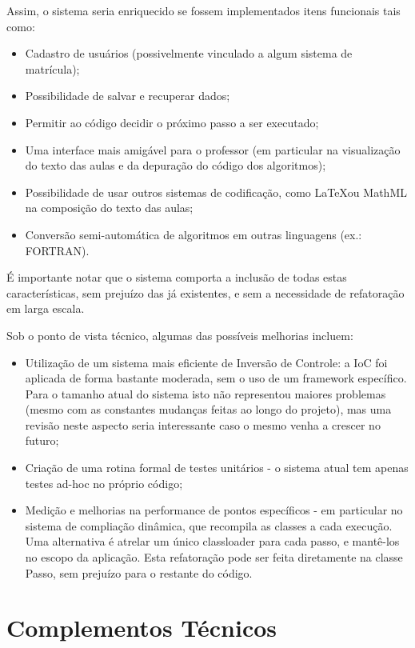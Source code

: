 \documentclass{abnt}
\begin{document}
Assim, o sistema seria enriquecido se fossem implementados itens funcionais tais como:

\begin{itemize}
\item Cadastro de usuários (possivelmente vinculado a algum sistema de matrícula);
\item Possibilidade de salvar e recuperar dados;
\item Permitir ao código decidir o próximo passo a ser executado;
\item Uma interface mais amigável para o professor (em particular na visualização do texto das aulas e da depuração do código dos algoritmos);
\item Possibilidade de usar outros sistemas de codificação, como \LaTeX ou MathML na composição do texto das aulas;
\item Conversão semi-automática de algoritmos em outras linguagens (ex.: FORTRAN).
\end{itemize}

É importante notar que o sistema comporta a inclusão de todas estas características, sem prejuízo das já existentes, e sem a necessidade de refatoração em larga escala.

Sob o ponto de vista técnico, algumas das possíveis melhorias incluem:

\begin{itemize}
\item Utilização de um sistema mais eficiente de Inversão de Controle: a IoC foi aplicada de forma bastante moderada, sem o uso de um framework específico. Para o tamanho atual do sistema isto não representou maiores problemas (mesmo com as constantes mudanças feitas ao longo do projeto), mas uma revisão neste aspecto seria interessante caso o mesmo venha a crescer no futuro;
\item Criação de uma rotina formal de testes unitários - o sistema atual tem apenas testes ad-hoc no próprio código;
\item Medição e melhorias na performance de pontos específicos - em particular no sistema de compliação dinâmica, que recompila as classes a cada execução. Uma alternativa é atrelar um único classloader para cada passo, e mantê-los no escopo da aplicação. Esta refatoração pode ser feita diretamente na classe Passo, sem prejuízo para o restante do código.
\end{itemize}



\appendix
\chapter {Complementos Técnicos}
\end{document}
